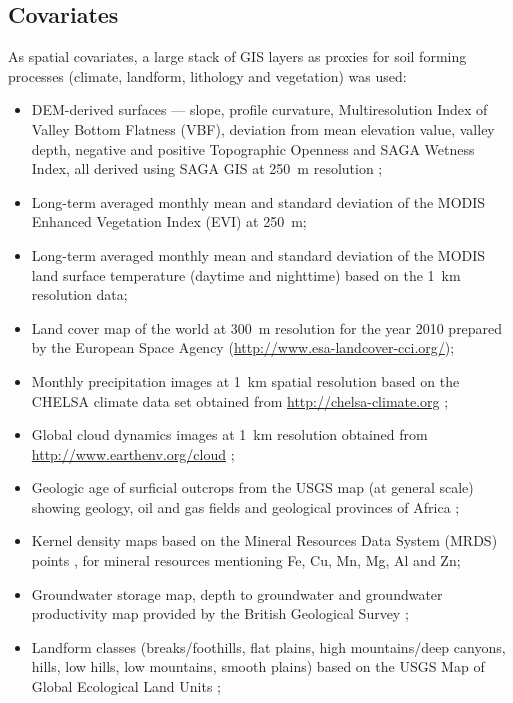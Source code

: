 \begin{linenumbers}
\clearpage

\subsection{Covariates}

As spatial covariates, a large stack of GIS layers as proxies for soil forming processes (climate, landform, lithology and vegetation) was used:

\begin{itemize}
  \item DEM-derived surfaces --- slope, profile curvature, Multiresolution Index of Valley Bottom Flatness (VBF), deviation from mean elevation value, valley depth, negative and positive Topographic Openness and SAGA Wetness Index, all derived using SAGA GIS at \SI{250}{\metre} resolution \citep{gmd-8-1991-2015};
  \item Long-term averaged monthly mean and standard deviation of the MODIS Enhanced Vegetation Index (EVI) at \SI{250}{\metre};
  \item Long-term averaged monthly mean and standard deviation of the MODIS land surface temperature (daytime and nighttime) based on the \SI{1}{\kilo\metre} resolution data;
  \item Land cover map of the world at \SI{300}{\metre} resolution for the year 2010 prepared by the European Space Agency (\url{http://www.esa-landcover-cci.org/});
  \item Monthly precipitation images at \SI{1}{\kilo\metre} spatial resolution based on the CHELSA climate data set obtained from \url{http://chelsa-climate.org} \citep{Karger2016CHELSA};
  \item Global cloud dynamics images at \SI{1}{\kilo\metre} resolution obtained from \url{http://www.earthenv.org/cloud} \citep{WilsonJetz2016};
  \item Geologic age of surficial outcrops from the USGS map (at general scale) showing geology, oil and gas fields and geological provinces of Africa \citep{Persits1997};
  \item Kernel density maps based on the Mineral Resources Data System (MRDS) points \citep{mcfaul2000us}, for mineral resources mentioning Fe, Cu, Mn, Mg, Al and Zn;
  \item Groundwater storage map, depth to groundwater and groundwater productivity map  provided by the British Geological Survey \citep{macdonald2012quantitative};
  \item Landform classes (breaks/foothills, flat plains, high mountains/deep canyons, hills, low hills, low mountains, smooth plains) based on the USGS Map of Global Ecological Land Units \citep{sayre2014new};

\end{itemize}
\end{linenumbers}
